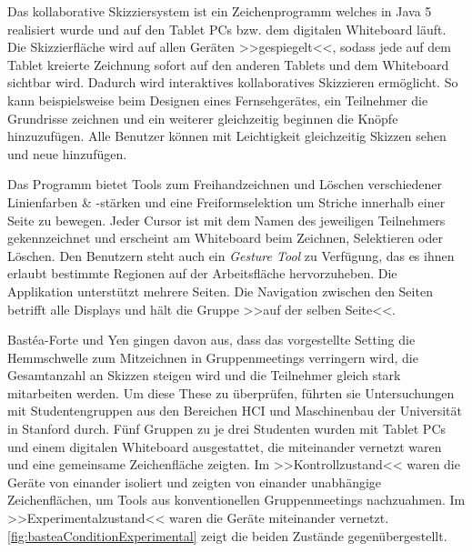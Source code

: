 \medskip Das kollaborative Skizziersystem ist ein Zeichenprogramm welches in Java 5 realisiert wurde und auf den Tablet PCs bzw. dem digitalen Whiteboard läuft. Die Skizzierfläche wird auf allen Geräten >>gespiegelt<<, sodass jede auf dem Tablet kreierte Zeichnung sofort auf den anderen Tablets und dem Whiteboard sichtbar wird. Dadurch wird interaktives kollaboratives Skizzieren ermöglicht. So kann beispielsweise beim Designen eines Fernsehgerätes, ein Teilnehmer die Grundrisse zeichnen und ein weiterer gleichzeitig beginnen die Knöpfe hinzuzufügen. Alle Benutzer können mit Leichtigkeit gleichzeitig Skizzen sehen und neue hinzufügen. 

\medskip Das Programm bietet Tools zum Freihandzeichnen und Löschen verschiedener Linienfarben \& -stärken und eine Freiformselektion um Striche innerhalb einer Seite zu bewegen. Jeder Cursor ist mit dem Namen des jeweiligen Teilnehmers gekennzeichnet und erscheint am Whiteboard beim Zeichnen, Selektieren oder Löschen. Den Benutzern steht auch ein \emph{Gesture Tool} zu Verfügung, das es ihnen erlaubt bestimmte Regionen auf der Arbeitsfläche hervorzuheben. Die Applikation unterstützt mehrere Seiten. Die Navigation zwischen den Seiten betrifft alle Displays und hält die Gruppe >>auf der selben Seite<<.

\medskip Bastéa-Forte und Yen gingen davon aus, dass das vorgestellte Setting die Hemmschwelle zum Mitzeichnen in Gruppenmeetings verringern wird, die Gesamtanzahl an Skizzen steigen wird und die Teilnehmer gleich stark mitarbeiten werden. Um diese These zu überprüfen, führten sie Untersuchungen mit Studentengruppen aus den Bereichen HCI und Maschinenbau der Universität in Stanford durch. Fünf Gruppen zu je drei Studenten wurden mit Tablet PCs und einem digitalen Whiteboard ausgestattet, die miteinander vernetzt waren und eine gemeinsame Zeichenfläche zeigten. Im >>Kontrollzustand<< waren die Geräte von einander isoliert und zeigten von einander unabhängige Zeichenflächen, um Tools aus konventionellen Gruppenmeetings nachzuahmen. Im >>Experimentalzustand<< waren die Geräte miteinander vernetzt. \autoref{fig:basteaConditionExperimental} zeigt die beiden Zustände gegenübergestellt.

